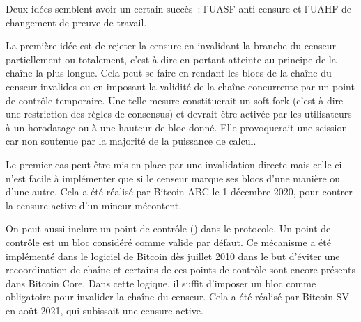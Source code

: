 Deux idées semblent avoir un certain succès~: l'UASF anti-censure et l'UAHF de changement de preuve de travail.


La première idée est de rejeter la censure en invalidant la branche du censeur partiellement ou totalement, c'est-à-dire en portant atteinte au principe de la chaîne la plus longue. Cela peut se faire en rendant les blocs de la chaîne du censeur invalides ou en imposant la validité de la chaîne concurrente par un point de contrôle temporaire. Une telle mesure constituerait un soft fork (c'est-à-dire une restriction des règles de consensus) et devrait être activée par les utilisateurs à un horodatage ou à une hauteur de bloc donné. Elle provoquerait une scission car non soutenue par la majorité de la puissance de calcul.

Le premier cas peut être mis en place par une invalidation directe mais celle-ci n'est facile à implémenter que si le censeur marque ses blocs d'une manière ou d'une autre. Cela a été réalisé par Bitcoin ABC le 1\ier{} décembre 2020, pour contrer la censure active d'un mineur mécontent.

On peut aussi inclure un point de contrôle () dans le protocole. Un point de contrôle est un bloc considéré comme valide par défaut. Ce mécanisme a été implémenté dans le logiciel de Bitcoin dès juillet 2010 dans le but d'éviter une recoordination de chaîne et certains de ces points de contrôle sont encore présents dans Bitcoin Core. Dans cette logique, il suffit d'imposer un bloc comme obligatoire pour invalider la chaîne du censeur. Cela a été réalisé par Bitcoin SV en août 2021, qui subissait une censure active.

